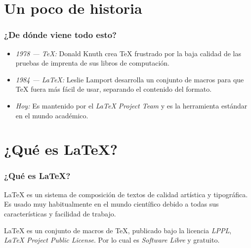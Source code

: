 \documentclass[12pt,aspectratio=169,ignorenonframetext]{ltxbeamer}
\begin{document}
\section{Un poco de historia}

\begin{frame}
\centering
\vfill
{}
\vfill
\end{frame}



\begin{frame}
    \frametitle{¿De dónde viene todo esto?}

    \pause

    \begin{itemize}[<+->]
        \item \emph{1978 --- {\lmr\TeX}:} Donald Knuth crea {\lmr\TeX} frustrado por la baja calidad de las pruebas de imprenta de sus libros de computación.
        \item \emph{1984 --- {\lmr\LaTeX}:} Leslie Lamport desarrolla un conjunto de macros para que {\lmr\TeX} fuera más fácil de usar, separando el contenido del formato.
        \item \emph{Hoy:} Es mantenido por el \textit{{\lmr\LaTeX} Project Team} y es la herramienta estándar en el mundo académico.
    \end{itemize}
    \centering
    \vfill
\end{frame}



\section{¿Qué es {\lmr\LaTeX}?}
\begin{frame}
\frametitle{¿Qué es {\lmr\LaTeX}?}

\pause

{\lmr\LaTeX} es un sistema de composición de textos de calidad artística y tipográfica. Es usado muy habitualmente en el mundo científico debido a todas sus características y facilidad de trabajo.

\pause

{\lmr\LaTeX} es un conjunto de macros de {\lmr\TeX}, publicado bajo la licencia {\it{\lmr L}PPL}, {\it{\lmr\LaTeX} Project Public License}. Por lo cual es \emph{Software Libre} y gratuito.
\end{frame}
\end{document}
